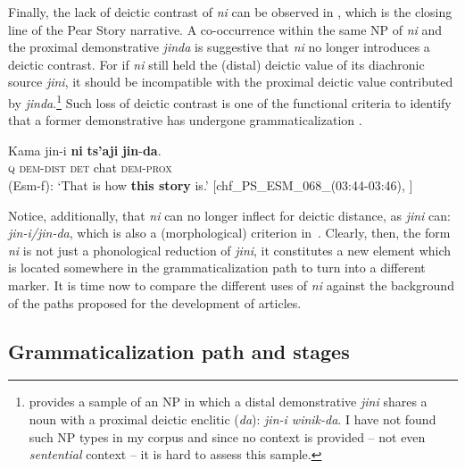\documentclass[output=paper
,modfonts
,nonflat]{langsci/langscibook}
\begin{document}
\z


Finally, the lack of deictic contrast of \textit{ni} can be observed in , which is the closing line of the Pear Story narrative. 
A co-occurrence within the same NP of \textit{ni} and the proximal demonstrative \textit{jinda} is suggestive that \textit{ni} no longer introduces a deictic contrast. For if \textit{ni} still held the (distal) deictic value of its diachronic source \textit{jini}, it should be incompatible with the proximal deictic value contributed by \textit{jinda}.\footnote{\citet[208, 236]{Knowles1984} provides a sample of an NP in which a distal demonstrative \textit{jini} shares a noun with a proximal deictic enclitic (\textit{da}): \textit{jin-i winik-da}. I have not found such NP types in my corpus and since no context is provided -- not even \textit{sentential} context -- it is hard to assess this sample.}
Such loss of deictic contrast is one of the functional criteria to identify that a former demonstrative has undergone grammaticalization \citep[][118]{Diessel1999}.

\ea  \label{ex:pico:54}

\gll Kama jin-i \textbf{ni} \textbf{ts'aji} \textbf{jin}-\textbf{da}.\\
\textsc{q} \textsc{dem}-\textsc{dist} \textsc{det} {chat} \textsc{dem}-\textsc{prox} \\
\glt (Esm-f): `That is how \textbf{this story} is.' [chf\_PS\_ESM\_068\_(03:44-03:46), \citealt{Delgado-Galvan2018archive}]
\z

Notice, additionally, that \textit{ni} can no longer inflect for deictic distance, as \textit{jini} can: \textit{jin-i/jin-da}, which is also a (morphological) criterion in~\citet[][118]{Diessel1999}. Clearly, then, the form \textit{ni} is not just a phonological reduction of \textit{jini}, it constitutes a new element which is located somewhere in the grammaticalization path to turn into a different marker. It is time now to compare the different uses of \textit{ni} against the background of the paths proposed for the development of articles.

\subsection{Grammaticalization path and stages}\label{sec:pico:4.2}
\end{document}
